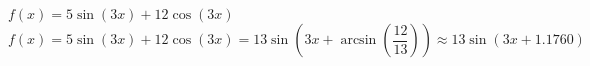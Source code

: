  {$f(x) = 5\sin(3x) + 12\cos(3x)$}
{ $f(x) = 5\sin(3x) + 12\cos(3x) = 13\sin\left(3x + \arcsin\left(\dfrac{12}{13}\right)\right) \approx 13\sin(3x + 1.1760)$}
